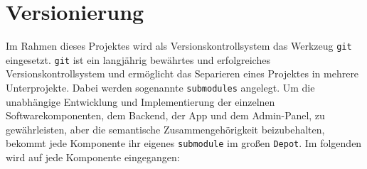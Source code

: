 \section{Versionierung}\label{CICD_Versionierung}

Im Rahmen dieses Projektes wird als Versionskontrollsystem das Werkzeug \verb#git# eingesetzt.
\verb#git# ist ein langjährig bewährtes und erfolgreiches Versionskontrollsystem und ermöglicht das Separieren eines Projektes in mehrere Unterprojekte.
Dabei werden sogenannte \verb#submodules# angelegt.
Um die unabhängige Entwicklung und Implementierung der einzelnen Softwarekomponenten, dem Backend, der App und dem Admin-Panel, zu gewährleisten, aber die semantische Zusammengehörigkeit beizubehalten,
bekommt jede Komponente ihr eigenes \verb#submodule# im großen \verb#Depot#.
Im folgenden wird auf jede Komponente eingegangen: